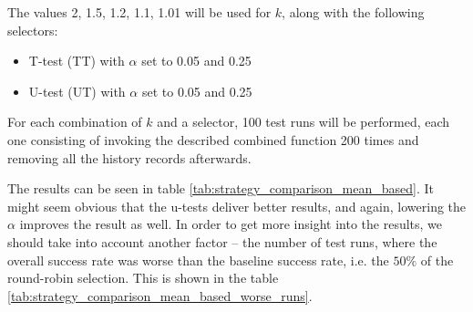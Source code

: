 The values 2, 1.5, 1.2, 1.1, 1.01 will be used for $k$, along with the following selectors:
\begin{itemize}
	\item T-test (TT) with $\alpha$ set to 0.05 and 0.25
	\item U-test (UT) with $\alpha$ set to 0.05 and 0.25
\end{itemize}

For each combination of $k$ and a selector, 100 test runs will be performed, each one consisting of invoking the described combined function 200 times and removing all the history records afterwards.

The results can be seen in table \ref{tab:strategy_comparison_mean_based}. It might seem obvious that the u-tests deliver better results, and again, lowering the $\alpha$ improves the result as well. In order to get more insight into the results, we should take into account another factor -- the number of test runs, where the overall success rate was worse than the baseline success rate, i.e. the $50\%$ of the round-robin selection. This is shown in the table \ref{tab:strategy_comparison_mean_based_worse_runs}.

